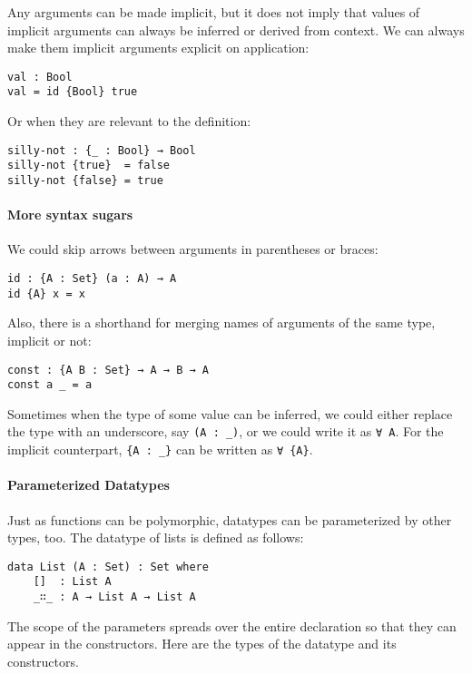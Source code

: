 \documentclass[\main/thesis.tex]{subfiles}
\begin{document}
Any arguments can be made implicit, but it does not imply that values of
implicit arguments can always be inferred or derived from context. We can always
make them implicit arguments explicit on application:

\begin{lstlisting}
val : Bool
val = id {Bool} true
\end{lstlisting}

Or when they are relevant to the definition:

\begin{lstlisting}
silly-not : {_ : Bool} → Bool
silly-not {true}  = false
silly-not {false} = true
\end{lstlisting}

\paragraph{More syntax sugars}

We could skip arrows between arguments in parentheses or braces:

\begin{lstlisting}
id : {A : Set} (a : A) → A
id {A} x = x
\end{lstlisting}

Also, there is a shorthand for merging names of arguments of the same type, implicit or not:

\begin{lstlisting}
const : {A B : Set} → A → B → A
const a _ = a
\end{lstlisting}

Sometimes when the type of some value can be inferred, we could either replace
the type with an underscore, say {\lstinline|(A : _)|}, or we could write it as
{\lstinline|∀ A|}. For the implicit counterpart, {\lstinline|{A : _}|} can be
written as {\lstinline|∀ {A}|}.

\paragraph{Parameterized Datatypes}


Just as functions can be polymorphic, datatypes can be parameterized by other
types, too. The datatype of lists is defined as follows:

\begin{lstlisting}
data List (A : Set) : Set where
    []  : List A
    _∷_ : A → List A → List A
\end{lstlisting}

The scope of the parameters spreads over the entire declaration so that they can
appear in the constructors.
Here are the types of the datatype and its constructors.
\end{document}
